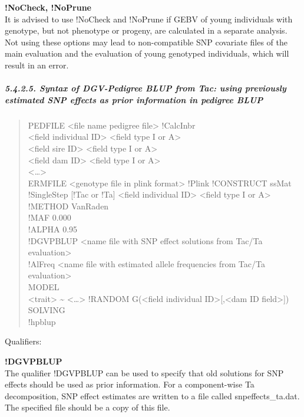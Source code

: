 \textbf{!NoCheck, !NoPrune}\\
It is advised to use !NoCheck and !NoPrune if GEBV of young individuals
with genotype, but not phenotype or progeny, are calculated in a
separate analysis. Not using these options may lead to non-compatible
SNP covariate files of the main evaluation and the evaluation of young
genotyped individuals, which will result in an error.

\subparagraph{5.4.2.5. Syntax of DGV-Pedigree BLUP from Tac: using
previously estimated SNP effects as prior information in pedigree
BLUP}\label{Gene48}

\begin{quote}
PEDFILE \textless file name pedigree file\textgreater{} !CalcInbr\\
\textless field individual ID\textgreater{} \textless field type I or
A\textgreater{}\\
\textless field sire ID\textgreater{} \textless field type I or
A\textgreater{}\\
\textless field dam ID\textgreater{} \textless field type I or
A\textgreater{}\\
\textless\ldots\textgreater{}\\
ERMFILE \textless genotype file in plink format\textgreater{} !Plink
!CONSTRUCT ssMat !SingleStep {[}!Tac or !Ta{]} \textless field
individual ID\textgreater{} \textless field type I or A\textgreater{}\\
!METHOD VanRaden\\
!MAF 0.000\\
!ALPHA 0.95\\
!DGVPBLUP \textless name file with SNP effect solutions from Tac/Ta
evaluation\textgreater{}\\
!AlFreq \textless name file with estimated allele frequencies from
Tac/Ta evaluation\textgreater{}\\
MODEL\\
\textless trait\textgreater{} \textasciitilde{}
\textless\ldots\textgreater{} !RANDOM G(\textless field individual
ID\textgreater{[},\textless dam ID field\textgreater{]})\\
SOLVING\\
!hpblup
\end{quote}

Qualifiers:

\textbf{!DGVPBLUP }\\
The qualifier !DGVPBLUP can be used to specify that old solutions for
SNP effects should be used as prior information. For a component-wise Ta
decomposition, SNP effect estimates are written to a file called
snpeffects\_ta.dat. The specified file should be a copy of this file.

